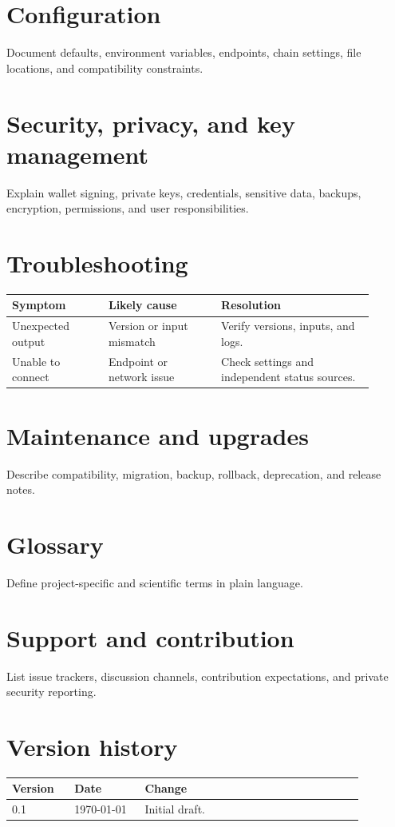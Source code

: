 \documentclass[11pt,a4paper]{article}
\begin{document}
\section{Configuration}
Document defaults, environment variables, endpoints, chain settings, file locations, and
compatibility constraints.
\section{Security, privacy, and key management}
Explain wallet signing, private keys, credentials, sensitive data, backups, encryption,
permissions, and user responsibilities.
\section{Troubleshooting}
\begin{longtable}{p{0.24\linewidth}p{0.28\linewidth}p{0.38\linewidth}}
\toprule Symptom & Likely cause & Resolution \\ \midrule
Unexpected output & Version or input mismatch & Verify versions, inputs, and logs. \\
Unable to connect & Endpoint or network issue & Check settings and independent status sources. \\
\bottomrule
\end{longtable}
\section{Maintenance and upgrades}
Describe compatibility, migration, backup, rollback, deprecation, and release notes.
\section{Glossary}
Define project-specific and scientific terms in plain language.
\section{Support and contribution}
List issue trackers, discussion channels, contribution expectations, and private security reporting.
\section{Version history}
\begin{longtable}{p{0.16\linewidth}p{0.18\linewidth}p{0.56\linewidth}}
\toprule Version & Date & Change \\ \midrule
0.1 & \today & Initial draft. \\ \bottomrule
\end{longtable}
\end{document}
